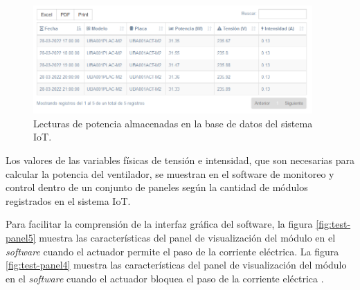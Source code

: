 \begin{figure}[htpb]
\centering 
\includegraphics[width=0.95\textwidth]{./Figures/test/consumo/lecturas.png}
\caption{Lecturas de potencia almacenadas en la base de datos del sistema IoT.}
\label{fig:registroPotencia}
\end{figure}



Los valores de las variables físicas de tensión e intensidad,  que son necesarias para calcular la  potencia del ventilador, se muestran en el software de monitoreo y control dentro de un conjunto de paneles según la cantidad de módulos registrados en el sistema IoT.

Para facilitar la comprensión de la interfaz gráfica del software, la figura \ref{fig:test-panel5} muestra las características del panel de visualización del módulo en el \emph{software} cuando el actuador permite el paso de la corriente eléctrica. La figura \ref{fig:test-panel4} muestra las características del panel de visualización del módulo en el \emph{software} cuando el actuador bloquea el paso de la corriente eléctrica .

